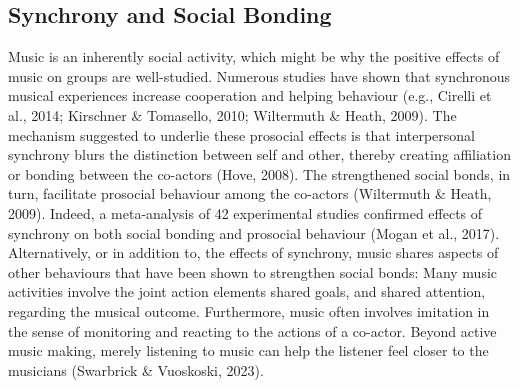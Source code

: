 \documentclass[
  man,floatsintext]{apa6}
\begin{document}
\subsection{Synchrony and Social Bonding}\label{music-bonding}

Music is an inherently social activity, which might be why the positive effects of music on groups are well-studied. Numerous studies have shown that synchronous musical experiences increase cooperation and helping behaviour (e.g., Cirelli et al., 2014; Kirschner \& Tomasello, 2010; Wiltermuth \& Heath, 2009). The mechanism suggested to underlie these prosocial effects is that interpersonal synchrony blurs the distinction between self and other, thereby creating affiliation or bonding between the co-actors (Hove, 2008). The strengthened social bonds, in turn, facilitate prosocial behaviour among the co-actors (Wiltermuth \& Heath, 2009). Indeed, a meta-analysis of 42 experimental studies confirmed effects of synchrony on both social bonding and prosocial behaviour (Mogan et al., 2017). Alternatively, or in addition to, the effects of synchrony, music shares aspects of other behaviours that have been shown to strengthen social bonds: Many music activities involve the joint action elements shared goals, and shared attention, regarding the musical outcome. Furthermore, music often involves imitation in the sense of monitoring and reacting to the actions of a co-actor. Beyond active music making, merely listening to music can help the listener feel closer to the musicians (Swarbrick \& Vuoskoski, 2023).
\end{document}
